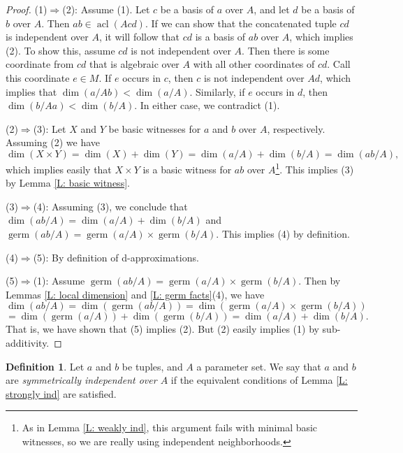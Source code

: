 \documentclass{amsart}
\theoremstyle{definition}
\newtheorem{definition}[theorem]{Definition}
\newcommand{\acl}{\operatorname{acl}}
\begin{document}
\begin{proof}
    (1)$\Rightarrow$(2): Assume (1). Let $c$ be a basis of $a$ over $A$, and let $d$ be a basis of $b$ over $A$. Then $ab\in\acl(Acd)$. If we can show that the concatenated tuple $cd$ is independent over $A$, it will follow that $cd$ is a basis of $ab$ over $A$, which implies (2). To show this, assume $cd$ is not independent over $A$. Then there is some coordinate from $cd$ that is algebraic over $A$ with all other coordinates of $cd$. Call this coordinate $e\in M$. If $e$ occurs in $c$, then $c$ is not independent over $Ad$, which implies that $\dim(a/Ab)<\dim(a/A)$. Similarly, if $e$ occurs in $d$, then $\dim(b/Aa)<\dim(b/A)$. In either case, we contradict (1).

    (2)$\Rightarrow$(3): Let $X$ and $Y$ be basic witnesses for $a$ and $b$ over $A$, respectively. Assuming (2) we have $$\dim(X\times Y)=\dim(X)+\dim(Y)=\dim(a/A)+\dim(b/A)=\dim(ab/A),$$ which implies easily that $X\times Y$ is a basic witness for $ab$ over $A$\footnote{As in Lemma \ref{L: weakly ind}, this argument fails with minimal basic witnesses, so we are really using independent neighborhoods.}. This implies (3) by Lemma \ref{L: basic witness}.
    
    (3)$\Rightarrow$(4): Assuming (3), we conclude that $\dim(ab/A)=\dim(a/A)+\dim(b/A)$ and $\operatorname{germ}(ab/A)=\operatorname{germ}(a/A)\times\operatorname{germ}(b/A)$. This implies (4) by definition.

    (4)$\Rightarrow$(5): By definition of d-approximations.

    (5)$\Rightarrow$(1): Assume $\operatorname{germ}(ab/A)=\operatorname{germ}(a/A)\times\operatorname{germ}(b/A)$. Then by Lemmas \ref{L: local dimension} and \ref{L: germ facts}(4), we have $$\dim(ab/A)=\dim(\operatorname{germ}(ab/A))=\dim(\operatorname{germ}(a/A)\times\operatorname{germ}(b/A))$$ $$=\dim(\operatorname{germ}(a/A))+\dim(\operatorname{germ}(b/A))=\dim(a/A)+\dim(b/A).$$ That is, we have shown that (5) implies (2). But (2) easily implies (1) by sub-additivity. %
    
\end{proof}

\begin{definition}
    Let $a$ and $b$ be tuples, and $A$ a parameter set. We say that $a$ and $b$ are \textit{symmetrically independent over $A$} if the equivalent conditions of Lemma \ref{L: strongly ind} are satisfied.
\end{definition}
\end{document}
